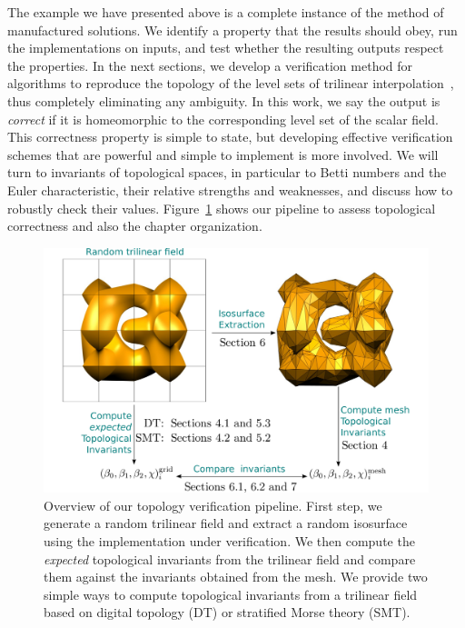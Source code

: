 The example we have presented above is a complete instance of the
method of manufactured solutions. We identify a property that the
results should obey, run the implementations on inputs, and test
whether the resulting outputs respect the properties.
%
In the next sections, we develop a verification method for algorithms
to reproduce the topology of the level sets of trilinear
interpolation~\cite{Chernyaev95marchingcubes,lopes:tvcg:2003,Nielson03onmarching},
thus completely eliminating any ambiguity. In this work, we say the
output is \emph{correct} if it is homeomorphic to the corresponding
level set of the scalar field.
%
This correctness property is simple to state, but developing effective
verification schemes that are powerful and simple to implement is more
involved. We will turn to invariants of topological spaces, in
particular to Betti numbers and the Euler characteristic, 
their relative strengths and weaknesses, and discuss how to robustly check
their values.  Figure~\ref{fig:pipeline} shows our pipeline to assess
topological correctness and also the chapter organization.

\begin{figure}[b]
\begin{center}
\includegraphics[width=1.0\linewidth,keepaspectratio=true]{chapter3/figures/pipeline.pdf}
\caption{Overview of our topology verification pipeline. First step,
  we generate a random trilinear field and extract a random isosurface
  using the implementation under verification. We then compute the
  \emph{expected} topological invariants from the trilinear field and
  compare them against the invariants obtained from the mesh. We
  provide two simple ways to compute topological invariants from a
  trilinear field based on digital topology (DT) or stratified Morse
  theory (SMT). }
\label{fig:pipeline}
\end{center}
\end{figure}

